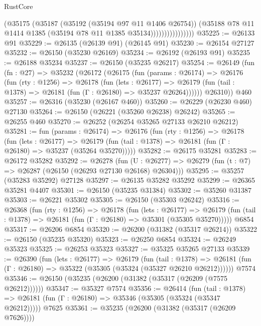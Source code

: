 \begin{lexlean}{RustCore}
\begin{coremodule}
                            (@35175
                              (@35187
                                (@35192 (@35194 @97 @11 @1406 @26754))
                                (@35188
                                  @78
                                  @11
                                  @1414
                                  @1385
                                  (@35194 @78 @11 @1385 @35134))))))))))))))))
@35225 := @26133 @91
@35229 := @26135 (@26139 @91) (@26145 @91)
@35230 := @26154 @27127
@35232 := @26150 (@35230 @26169)
@35234 := @26192 (@26193 @91)
@35235 := @26188 @35234
@35237 := @26150 (@35235 @26217)
@35254 := @26149
    (fun (fn : @27) =>
    @35232
      (@26172
        (@26175
          (fun (params : @26174) =>
          @26176
            (fun (rty : @1256) =>
            @26178
              (fun (lets : @26177) =>
              @26179 (fun (tail : @1378) => @26181 (fun (Γ : @26180) => @35237 @26264))))))
        @26310))
    @460
@35257 := @26316 (@35230 (@26167 @460))
@35260 := @26229 (@26230 @460) @27130
@35264 := @26150 (@26221 (@35260 @26238) @26242)
@35265 := @26255 @460
@35270 := @26252 (@26254 @35265 @27133 @26210 @26212)
@35281 := fun (params : @26174) =>
  @26176
    (fun (rty : @1256) =>
    @26178
      (fun (lets : @26177) =>
      @26179 (fun (tail : @1378) => @26181 (fun (Γ : @26180) => @35237 (@35264 @35270)))))
@35282 := @26175 @35281
@35283 := @26172 @35282
@35292 := @26278
    (fun (U : @26277) => @26279 (fun (t : @7) => @26287 (@26150 (@26293 @27130 @26168) @26304)))
@35295 := @35257 (@35283 @35292) @27128
@35297 := @26135 @35282 @35292
@35299 := @26365 @35281 @4407
@35301 := @26150 (@35235 @31384)
@35302 := @35260 @31387
@35303 := @26221 @35302
@35305 := @26150 (@35303 @26242)
@35316 := @26368
    (fun (rty : @1256) =>
    @26178
      (fun (lets : @26177) =>
      @26179 (fun (tail : @1378) => @26181 (fun (Γ : @26180) => @35301 (@35305 @35270)))))
    @6854
@35317 := @26206 @6854
@35320 := @26200 (@31382 (@35317 @26214))
@35322 := @26150 (@35235 @35320)
@35323 := @26250 @6854
@35324 := @26249 @35323
@35325 := @26253 @35323
@35327 := @35325 @35265 @27133
@35339 := @26390
    (fun (lets : @26177) =>
    @26179
      (fun (tail : @1378) =>
      @26181 (fun (Γ : @26180) => @35322 (@35305 (@35324 (@35327 @26210 @26212))))))
    @7574
@35346 := @26150 (@35235 (@26200 (@31382 (@35317 (@26209 (@7575 @26212))))))
@35347 := @35327 @7574
@35356 := @26414
    (fun (tail : @1378) => @26181 (fun (Γ : @26180) => @35346 (@35305 (@35324 (@35347 @26212)))))
    @7625
@35361 := @35235 (@26200 (@31382 (@35317 (@26209 @7626))))

\end{coremodule}
\end{lexlean}
